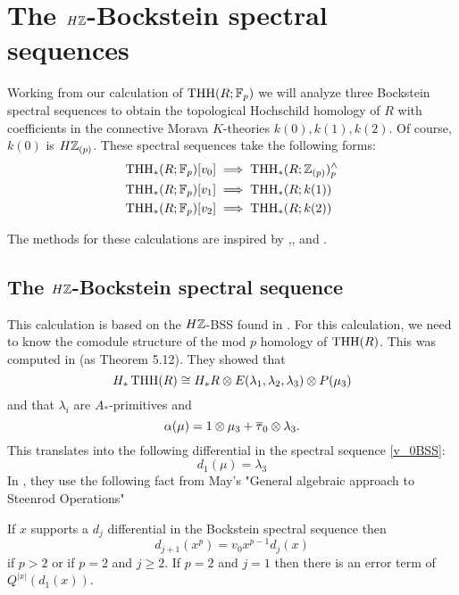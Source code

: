 
\section{The $H\mathbb{Z}$-Bockstein spectral sequences}

Working from our calculation of $\operatorname{THH}(R;\mathbb{F}_p)$ we will analyze three Bockstein spectral sequences to obtain the topological Hochschild homology of $R$ with coefficients in the connective Morava $K$-theories $k(0), k(1), k(2)$. Of course, $k(0)$ is $H\mathbb{Z}_{(p)}$. These spectral sequences take the following forms: 
\begin{align}
	\label{v_0BSS}\operatorname{THH}_*(R;\mathbb{F}_p)[v_0]&\implies \operatorname{THH}_*(R;\mathbb{Z}_{(p)})^{\wedge}_p\\
	\label{v_1BSS}\operatorname{THH}_*(R;\mathbb{F}_p)[v_1]&\implies \operatorname{THH}_*(R;k(1))\\
	\label{v_2BSS}\operatorname{THH}_*(R;\mathbb{F}_p)[v_2]&\implies \operatorname{THH}_*(R;k(2))
\end{align}

The methods for these calculations are inspired by \cite{McClureStaffeldt},\cite{AngeltveitRognes}, and \cite{AHL}.

\subsection{The $H\mathbb{Z}$-Bockstein spectral sequence}

This calculation is based on the $H\mathbb{Z}$-BSS found in \cite{AHL}. For this calculation, we need to know the comodule structure of the mod $p$ homology of $\operatorname{THH}(R)$. This was computed in \cite{AngeltveitRognes} (as Theorem 5.12). They showed that 
\begin{equation}\label{eqn:homologyTHHR}
H_*\operatorname{THH}(R) \cong H_*R\otimes E(\lambda_1, \lambda_2, \lambda_3)\otimes P(\mu_3)
\end{equation}
and that $\lambda_i$ are $A_*$-primitives and 
\[
\alpha(\mu) = 1\otimes \mu_3+\overline{\tau}_0\otimes \lambda_3.
\]
This translates into the following differential in the spectral sequence \eqref{v_0BSS}:
\[
d_1(\mu) = \lambda_3
\]
In \cite{AHL}, they use the following fact from May's "General algebraic approach to Steenrod Operations"

\begin{lem}
	If $x$ supports a $d_j$ differential in the Bockstein spectral sequence then 
	\[
	d_{j+1}(x^p) = v_0x^{p-1}d_j(x)
	\]
	if $p>2$ or if $p=2$ and $j\geq 2$. If $p=2$ and $j=1$ then there is an error term of $Q^{|x|}(d_1(x))$.
	\end{lem}

